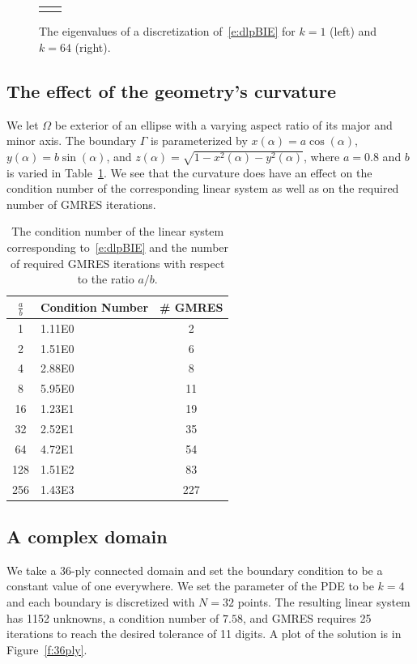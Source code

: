 \documentclass[final]{siamltex}
\begin{document}
\begin{figure}[htps]
\centering
\begin{tabular}{cc}
 &

\end{tabular}
\caption{\label{f:evalues} The eigenvalues of a discretization
of~\eqref{e:dlpBIE} for $k=1$ (left) and $k=64$ (right).}
\end{figure}


\subsection{The effect of the geometry's curvature}
We let $\Omega$ be exterior of an ellipse with a varying aspect ratio of
its major and minor axis.  The boundary $\Gamma$ is parameterized by
$x(\alpha) = a\cos(\alpha)$, $y(\alpha) = b\sin(\alpha)$, and $z(\alpha)
= \sqrt{1-x^{2}(\alpha)-y^{2}(\alpha)}$, where $a = 0.8$ and $b$ is
varied in Table~\ref{t:example3}.  We see that the curvature does have
an effect on the condition number of the corresponding linear system as
well as on the required number of GMRES iterations.

\begin{table}[htps]
\centering
\begin{tabular}{c>{\centering}m{2cm}c}
$\frac{a}{b}$ & Condition Number & \# GMRES \\
\hline
1   & 1.11E0 & 2   \\ 
2   & 1.51E0 & 6   \\
4   & 2.88E0 & 8   \\
8   & 5.95E0 & 11  \\
16  & 1.23E1 & 19  \\
32  & 2.52E1 & 35  \\
64  & 4.72E1 & 54  \\
128 & 1.51E2 & 83  \\
256 & 1.43E3 & 227 \\
\end{tabular}
\caption{\label{t:example3} The condition number of the linear system
corresponding to~\eqref{e:dlpBIE} and the number of required GMRES
iterations with respect to the ratio $a/b$.}
\end{table}


\subsection{A complex domain}
We take a 36-ply connected domain and set the boundary condition to be a
constant value of one everywhere.  We set the parameter of the PDE to be
$k=4$ and each boundary is discretized with $N=32$ points.  The
resulting linear system has 1152 unknowns, a condition number of $7.58$,
and GMRES requires 25 iterations to reach the desired tolerance of 11
digits.  A plot of the solution is in Figure~\ref{f:36ply}.
\end{document}
